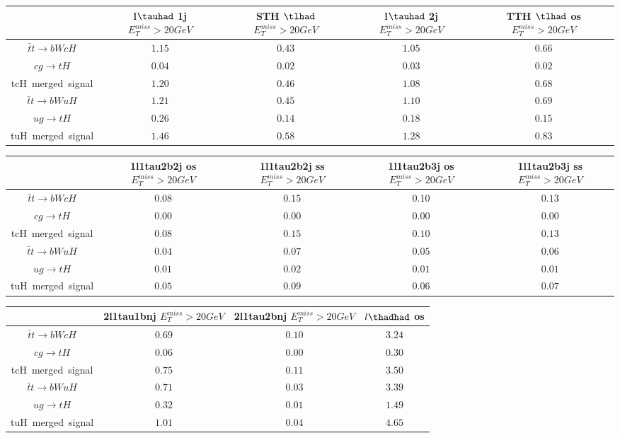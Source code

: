 \centering
\begin{tabular}{|c|c|c|c|c|} \hline
 & l$\tauhad$ 1j  $E_T^{miss}>20GeV$ & STH $\tlhad$   $E_T^{miss}>20GeV$ & l$\tauhad$ 2j  $E_T^{miss}>20GeV$ & TTH $\tlhad$ os  $E_T^{miss}>20GeV$\\\hline
$\bar{t}t\to bWcH$ & $1.15$ & $0.43$ & $1.05$ & $0.66$\\\hline
$cg\to tH$ & $0.04$ & $0.02$ & $0.03$ & $0.02$\\\hline
tcH~merged~signal & $1.20$ & $0.46$ & $1.08$ & $0.68$\\\hline
$\bar{t}t\to bWuH$ & $1.21$ & $0.45$ & $1.10$ & $0.69$\\\hline
$ug\to tH$ & $0.26$ & $0.14$ & $0.18$ & $0.15$\\\hline
tuH~merged~signal & $1.46$ & $0.58$ & $1.28$ & $0.83$\\\hline
\end{tabular}
\begin{tabular}{|c|c|c|c|c|} \hline
 & 1l1tau2b2j os  $E_T^{miss}>20GeV$ & 1l1tau2b2j ss  $E_T^{miss}>20GeV$ & 1l1tau2b3j os  $E_T^{miss}>20GeV$ & 1l1tau2b3j ss  $E_T^{miss}>20GeV$\\\hline
$\bar{t}t\to bWcH$ & $0.08$ & $0.15$ & $0.10$ & $0.13$\\\hline
$cg\to tH$ & $0.00$ & $0.00$ & $0.00$ & $0.00$\\\hline
tcH~merged~signal & $0.08$ & $0.15$ & $0.10$ & $0.13$\\\hline
$\bar{t}t\to bWuH$ & $0.04$ & $0.07$ & $0.05$ & $0.06$\\\hline
$ug\to tH$ & $0.01$ & $0.02$ & $0.01$ & $0.01$\\\hline
tuH~merged~signal & $0.05$ & $0.09$ & $0.06$ & $0.07$\\\hline
\end{tabular}
\begin{tabular}{|c|c|c|c|} \hline
 & 2l1tau1bnj  $E_T^{miss}>20GeV$ & 2l1tau2bnj  $E_T^{miss}>20GeV$ & $l\thadhad$ os\\\hline
$\bar{t}t\to bWcH$ & $0.69$ & $0.10$ & $3.24$\\\hline
$cg\to tH$ & $0.06$ & $0.00$ & $0.30$\\\hline
tcH~merged~signal & $0.75$ & $0.11$ & $3.50$\\\hline
$\bar{t}t\to bWuH$ & $0.71$ & $0.03$ & $3.39$\\\hline
$ug\to tH$ & $0.32$ & $0.01$ & $1.49$\\\hline
tuH~merged~signal & $1.01$ & $0.04$ & $4.65$\\\hline
\end{tabular}
